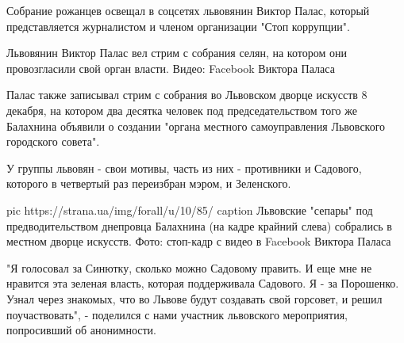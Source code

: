 Собрание рожанцев освещал в соцсетях львовянин Виктор Палас, который
представляется журналистом и членом организации "Стоп коррупции".  


Львовянин Виктор Палас вел стрим с собрания селян, на котором они провозгласили
свой орган власти. Видео: Facebook Виктора Паласа

Палас также записывал стрим с собрания во Львовском дворце искусств 8
декабря, на котором два десятка человек под председательством того же
Балахнина объявили о создании "органа местного самоуправления Львовского
городского совета".

У группы львовян - свои мотивы, часть из них - противники и Садового,
которого в четвертый раз переизбран мэром, и Зеленского. 

\ifcmt
pic https://strana.ua/img/forall/u/10/85/%
caption Львовские "сепары" под предводительством днепровца Балахнина (на кадре крайний слева) собрались в местном дворце искусств. Фото: стоп-кадр с видео в Facebook Виктора Паласа
\fi


"Я голосовал за Синютку, сколько можно Садовому править. И еще мне не
нравится эта зеленая власть, которая поддерживала Садового. Я - за
Порошенко. Узнал через знакомых, что во Львове будут создавать свой
горсовет, и решил поучаствовать", - поделился с нами участник львовского
мероприятия, попросивший об анонимности.  
